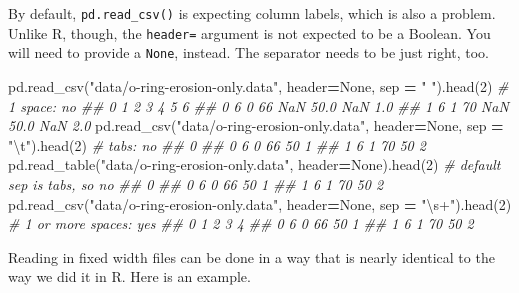 \documentclass[
  12pt,
  krantz2]{krantz}
\makeatletter
\newenvironment{Shaded}{\begin{snugshade}}{\end{snugshade}}
\newcommand{\CharTok}[1]{\textcolor[rgb]{0.5,0.5,0.5}{#1}}
\newcommand{\CommentTok}[1]{\textcolor[rgb]{0.37,0.37,0.37}{\textit{#1}}}
\newcommand{\DecValTok}[1]{\textcolor[rgb]{0.06,0.06,0.06}{#1}}
\newcommand{\NormalTok}[1]{#1}
\newcommand{\OperatorTok}[1]{\textcolor[rgb]{0.43,0.43,0.43}{\textbf{#1}}}
\newcommand{\StringTok}[1]{\textcolor[rgb]{0.5,0.5,0.5}{#1}}
\newcommand{\VariableTok}[1]{\textcolor[rgb]{0,0,0}{#1}}
\newenvironment{kframe}{%
\medskip{}
\setlength{\fboxsep}{.8em}
 \def\at@end@of@kframe{}%
 \ifinner\ifhmode%
  \def\at@end@of@kframe{\end{minipage}}%
  \begin{minipage}{\columnwidth}%
 \fi\fi%
 \def\FrameCommand##1{\hskip\@totalleftmargin \hskip-\fboxsep
 \colorbox{shadecolor}{##1}\hskip-\fboxsep
     \hskip-\linewidth \hskip-\@totalleftmargin \hskip\columnwidth}%
 \MakeFramed {\advance\hsize-\width
   \@totalleftmargin\z@ \linewidth\hsize
   \@setminipage}}%
 {\par\unskip\endMakeFramed%
 \at@end@of@kframe}
\renewenvironment{Shaded}{\begin{kframe}}{\end{kframe}}
\makeatother
\begin{document}
By default, \texttt{pd.read\_csv()} is expecting column labels, which is also a problem. Unlike R, though, the \texttt{header=} argument is not expected to be a Boolean. You will need to provide a \texttt{None}, instead. The separator needs to be just right, too.

\begin{Shaded}
\begin{Highlighting}[]
\NormalTok{pd.read\_csv(}\StringTok{"data/o{-}ring{-}erosion{-}only.data"}\NormalTok{, }
\NormalTok{              header}\OperatorTok{=}\VariableTok{None}\NormalTok{, sep }\OperatorTok{=} \StringTok{" "}\NormalTok{).head(}\DecValTok{2}\NormalTok{) }\CommentTok{\# 1 space: no}
\CommentTok{\#\#    0  1   2   3     4   5    6}
\CommentTok{\#\# 0  6  0  66 NaN  50.0 NaN  1.0}
\CommentTok{\#\# 1  6  1  70 NaN  50.0 NaN  2.0}
\NormalTok{pd.read\_csv(}\StringTok{"data/o{-}ring{-}erosion{-}only.data"}\NormalTok{, }
\NormalTok{              header}\OperatorTok{=}\VariableTok{None}\NormalTok{, sep }\OperatorTok{=} \StringTok{"}\CharTok{\textbackslash{}t}\StringTok{"}\NormalTok{).head(}\DecValTok{2}\NormalTok{) }\CommentTok{\# tabs: no}
\CommentTok{\#\#                0}
\CommentTok{\#\# 0  6 0 66  50  1}
\CommentTok{\#\# 1  6 1 70  50  2}
\NormalTok{pd.read\_table(}\StringTok{"data/o{-}ring{-}erosion{-}only.data"}\NormalTok{, }
\NormalTok{              header}\OperatorTok{=}\VariableTok{None}\NormalTok{).head(}\DecValTok{2}\NormalTok{) }\CommentTok{\# default sep is tabs, so no}
\CommentTok{\#\#                0}
\CommentTok{\#\# 0  6 0 66  50  1}
\CommentTok{\#\# 1  6 1 70  50  2}
\NormalTok{pd.read\_csv(}\StringTok{"data/o{-}ring{-}erosion{-}only.data"}\NormalTok{, }
\NormalTok{              header}\OperatorTok{=}\VariableTok{None}\NormalTok{, sep }\OperatorTok{=} \StringTok{"\textbackslash{}s+"}\NormalTok{).head(}\DecValTok{2}\NormalTok{) }\CommentTok{\# 1 or more spaces: yes}
\CommentTok{\#\#    0  1   2   3  4}
\CommentTok{\#\# 0  6  0  66  50  1}
\CommentTok{\#\# 1  6  1  70  50  2}
\end{Highlighting}
\end{Shaded}

Reading in fixed width files can be done in a way that is nearly identical to the way we did it in R. Here is an example.
\end{document}
